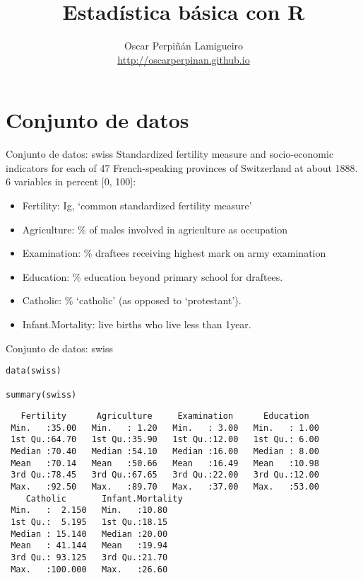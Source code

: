 \documentclass[xcolor={usenames,svgnames,dvipsnames}]{beamer}
\author{Oscar Perpiñán Lamigueiro \\ \url{http://oscarperpinan.github.io}}
\date{}
\title{Estadística básica con R}
\begin{document}
\maketitle

\section{Conjunto de datos}
\label{sec:org02f5090}

\begin{frame}[label={sec:org86c1e12}]{Conjunto de datos: swiss}
Standardized fertility measure and socio-economic indicators for
each of 47 French-speaking provinces of Switzerland at
about 1888. 6 variables in percent [0, 100]:

\begin{itemize}
\item \alert{Fertility}:         Ig, ‘common standardized fertility measure’
\item \alert{Agriculture}:       \% of males involved in agriculture as occupation
\item \alert{Examination}:       \% draftees receiving highest mark on army examination
\item \alert{Education}:         \% education beyond primary school for draftees.
\item \alert{Catholic}:          \% ‘catholic’ (as opposed to ‘protestant’).
\item \alert{Infant.Mortality}:  live births who live less than 1year.
\end{itemize}
\end{frame}

\begin{frame}[fragile,label={sec:org3f5e32c}]{Conjunto de datos: swiss}
 \lstset{language=r,label= ,caption= ,captionpos=b,numbers=none}
\begin{lstlisting}
data(swiss)

summary(swiss)
\end{lstlisting}

\begin{verbatim}
   Fertility      Agriculture     Examination      Education    
 Min.   :35.00   Min.   : 1.20   Min.   : 3.00   Min.   : 1.00  
 1st Qu.:64.70   1st Qu.:35.90   1st Qu.:12.00   1st Qu.: 6.00  
 Median :70.40   Median :54.10   Median :16.00   Median : 8.00  
 Mean   :70.14   Mean   :50.66   Mean   :16.49   Mean   :10.98  
 3rd Qu.:78.45   3rd Qu.:67.65   3rd Qu.:22.00   3rd Qu.:12.00  
 Max.   :92.50   Max.   :89.70   Max.   :37.00   Max.   :53.00  
    Catholic       Infant.Mortality
 Min.   :  2.150   Min.   :10.80   
 1st Qu.:  5.195   1st Qu.:18.15   
 Median : 15.140   Median :20.00   
 Mean   : 41.144   Mean   :19.94   
 3rd Qu.: 93.125   3rd Qu.:21.70   
 Max.   :100.000   Max.   :26.60
\end{verbatim}
\end{frame}
\end{document}
